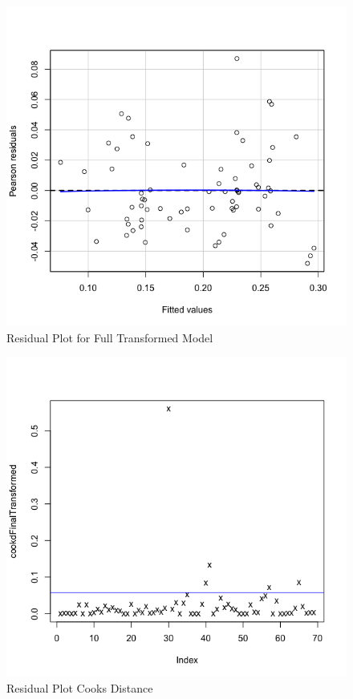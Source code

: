 \documentclass[12pt]{article}
\makeatletter
\theoremstyle{homework}
\newenvironment{exercise}[1]
{\def\@currentlabel{#1}\exercisecore}
{\endexercisecore}
\makeatother
\begin{document}
\begin{exercise}{1}
\begin{enumerate}
\begin{figure}[H]
\begin{center}
        \caption{Residual Plot for Full Transformed Model}
        \includegraphics[width = \textwidth]{Rplot10.png}
        \end{center}
      \end{figure}
      \begin{figure}[H]
        \begin{center}
        \caption{Residual Plot Cooks Distance}
        \includegraphics[width = \textwidth]{Rplot11.png}
        \end{center}
      \end{figure}
      \newpage


\end{enumerate}
\end{exercise}
\end{document}
